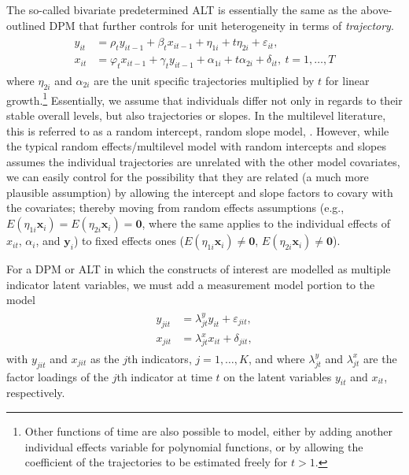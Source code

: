\documentclass[]{interact}
\theoremstyle{plain}%
\theoremstyle{definition}
\theoremstyle{remark}
\begin{document}
The so-called bivariate predetermined ALT is essentially the same as the
above-outlined DPM that further controls for unit heterogeneity in terms
of \emph{trajectory}. \begin{align}
\begin{split}
y_{it} & = \rho_{t} y_{it-1} + \beta_{t} x_{it-1} + \eta_{1i} + t\eta_{2i} + \varepsilon_{it}, \\
x_{it} & = \varphi_{t} x_{it-1} + \gamma_{t} y_{it-1} + \alpha_{1i} + t\alpha_{2i} + \delta_{it}, \ t = 1, \ldots, T \label{alt}
\end{split}
\end{align} where \(\eta_{2i}\) and \(\alpha_{2i}\) are the unit
specific trajectories multiplied by \(t\) for linear growth.\footnote{Other
  functions of time are also possible to model, either by adding another
  individual effects variable for polynomial functions, or by allowing
  the coefficient of the trajectories to be estimated freely for
  \(t > 1\).} Essentially, we assume that individuals differ not only in
regards to their stable overall levels, but also trajectories or slopes.
In the multilevel literature, this is referred to as a random intercept,
random slope model, \citet{Hox2010}. However, while the typical random
effects/multilevel model with random intercepts and slopes assumes the
individual trajectories are unrelated with the other model covariates,
we can easily control for the possibility that they are related (a much
more plausible assumption) by allowing the intercept and slope factors
to covary with the covariates; thereby moving from random effects
assumptions (e.g.,
\(E(\eta_{1i}\bm{x}_{i}) = E(\eta_{2i}\bm{x}_{i}) = \bm{0}\), where the
same applies to the individual effects of \(x_{it}\), \(\alpha_{i}\),
and \(\bm{y}_{i}\)) to fixed effects ones
(\(E(\eta_{1i}\bm{x}_{i}) \ne \bm{0}\),
\(E(\eta_{2i}\bm{x}_{i}) \ne \bm{0}\)).

For a DPM or ALT in which the constructs of interest are modelled as
multiple indicator latent variables, we must add a measurement model
portion to the model \begin{align}
\begin{split}
y_{jit} & = \lambda^{y}_{jt}y_{it} + \varepsilon_{jit}, \\
x_{jit} & = \lambda^{x}_{jt}x_{it} + \delta_{jit}, \label{meas-model}
\end{split}
\end{align} with \(y_{jit}\) and \(x_{jit}\) as the \(j\)th indicators,
\(j = 1, \ldots, K\), and where \(\lambda^{y}_{jt}\) and
\(\lambda^{x}_{jt}\) are the factor loadings of the \(j\)th indicator at
time \(t\) on the latent variables \(y_{it}\) and \(x_{it}\),
respectively.
\end{document}
